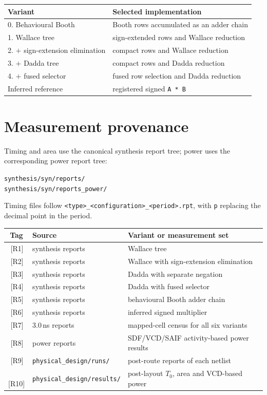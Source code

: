 \documentclass[11pt,a4paper]{article}
\newcommand{\src}[1]{\,{\footnotesize\color{accent}[#1]}}
\begin{document}
\begin{table}[!ht]
\centering\small
\begin{tabular}{@{}p{}p{}@{}}
\toprule
\textbf{Variant} & \textbf{Selected implementation} \\
\midrule
0. Behavioural Booth & Booth rows accumulated as an adder chain \\
1. Wallace tree & sign-extended rows and Wallace reduction \\
2. $+$ sign-extension elimination & compact rows and Wallace reduction \\
3. $+$ Dadda tree & compact rows and Dadda reduction \\
4. $+$ fused selector & fused row selection and Dadda reduction \\
Inferred reference & registered signed \texttt{A * B} \\
\bottomrule
\end{tabular}
\end{table}

\section{Measurement provenance}
\label{app:prov}

Timing and area use the canonical synthesis report tree; power uses the
corresponding power report tree:
\begin{center}
\texttt{synthesis/syn/reports/} \\
\texttt{synthesis/syn/reports\_power/}
\end{center}
Timing files follow \texttt{<type>\_<configuration>\_<period>.rpt}, with
\texttt{p} replacing the decimal point in the period.

\begin{table}[!ht]
\centering\footnotesize
\begin{tabular}{@{}clp{}@{}}
\toprule
\textbf{Tag} & \textbf{Source} & \textbf{Variant or measurement set} \\
\midrule
\src{R1} & synthesis reports & Wallace tree \\
\src{R2} & synthesis reports & Wallace with sign-extension elimination \\
\src{R3} & synthesis reports & Dadda with separate negation \\
\src{R4} & synthesis reports & Dadda with fused selector \\
\src{R5} & synthesis reports & behavioural Booth adder chain \\
\src{R6} & synthesis reports & inferred signed multiplier \\
\src{R7} & 3.0\,ns reports & mapped-cell census for all six variants \\
\src{R8} & power reports & SDF/VCD/SAIF activity-based power results \\
\src{R9} & \texttt{physical\_design/runs/} & post-route reports of each netlist \\
\src{R10} & \texttt{physical\_design/results/} & post-layout $T_0$, area and VCD-based power \\
\bottomrule
\end{tabular}
\end{table}
\end{document}
